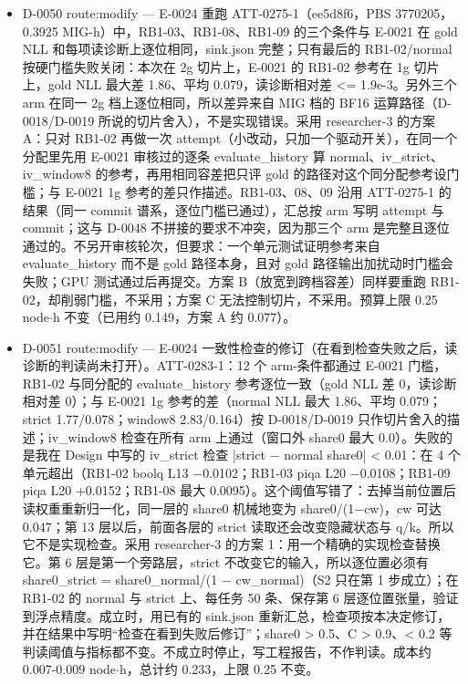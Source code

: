 \documentclass[11pt]{article}
\begin{document}
\begin{itemize}
\item D-0050 route:modify --- E-0024 重跑 ATT-0275-1（ee5d8f6，PBS 3770205，0.3925 MIG-h）中，RB1-03、RB1-08、RB1-09 的三个条件与 E-0021 在 gold NLL 和每项读诊断上逐位相同，sink.json 完整；只有最后的 RB1-02/normal 按硬门槛失败关闭：本次在 2g 切片上，E-0021 的 RB1-02 参考在 1g 切片上，gold NLL 最大差 1.86、平均 0.079，读诊断相对差 \textless{}= 1.9e-3。另外三个 arm 在同一 2g 档上逐位相同，所以差异来自 MIG 档的 BF16 运算路径（D-0018/D-0019 所说的切片舍入），不是实现错误。采用 researcher-3 的方案 A：只对 RB1-02 再做一次 attempt（小改动，只加一个驱动开关），在同一个分配里先用 E-0021 审核过的逐条 evaluate\_history 算 normal、iv\_strict、iv\_window8 的参考，再用相同容差把只评 gold 的路径对这个同分配参考设门槛；与 E-0021 1g 参考的差只作描述。RB1-03、08、09 沿用 ATT-0275-1 的结果（同一 commit 谱系，逐位门槛已通过），汇总按 arm 写明 attempt 与 commit；这与 D-0048 不拼接的要求不冲突，因为那三个 arm 是完整且逐位通过的。不另开审核轮次，但要求：一个单元测试证明参考来自 evaluate\_history 而不是 gold 路径本身，且对 gold 路径输出加扰动时门槛会失败；GPU 测试通过后再提交。方案 B（放宽到跨档容差）同样要重跑 RB1-02，却削弱门槛，不采用；方案 C 无法控制切片，不采用。预算上限 0.25 node\ensuremath{\cdot}h 不变（已用约 0.149，方案 A 约 0.077）。
\item D-0051 route:modify --- E-0024 一致性检查的修订（在看到检查失败之后，读诊断的判读尚未打开）。ATT-0283-1：12 个 arm-条件都通过 E-0021 门槛，RB1-02 与同分配的 evaluate\_history 参考逐位一致（gold NLL 差 0，读诊断相对差 0）；与 E-0021 1g 参考的差（normal NLL 最大 1.86、平均 0.079；strict 1.77/0.078；window8 2.83/0.164）按 D-0018/D-0019 只作切片舍入的描述；iv\_window8 检查在所有 arm 上通过（窗口外 share0 最大 0.0）。失败的是我在 Design 中写的 iv\_strict 检查 |strict \ensuremath{-} normal share0| \textless{} 0.01：在 4 个单元超出（RB1-02 boolq L13 \ensuremath{-}0.0102；RB1-03 piqa L20 \ensuremath{-}0.0108；RB1-09 piqa L20 +0.0152；RB1-08 最大 0.0095）。这个阈值写错了：去掉当前位置后读权重重新归一化，同一层的 share0 机械地变为 share0/(1\ensuremath{-}cw)，cw 可达 0.047；第 13 层以后，前面各层的 strict 读取还会改变隐藏状态与 q/k。所以它不是实现检查。采用 researcher-3 的方案 1：用一个精确的实现检查替换它。第 6 层是第一个旁路层，strict 不改变它的输入，所以逐位置必须有 share0\_strict = share0\_normal/(1 \ensuremath{-} cw\_normal)（S2 只在第 1 步成立）；在 RB1-02 的 normal 与 strict 上、每任务 50 条、保存第 6 层逐位置张量，验证到浮点精度。成立时，用已有的 sink.json 重新汇总，检查项按本决定修订，并在结果中写明``检查在看到失败后修订''；share0 \textgreater{} 0.5、C \textgreater{} 0.9、\textless{} 0.2 等判读阈值与指标都不变。不成立时停止，写工程报告，不作判读。成本约 0.007-0.009 node\ensuremath{\cdot}h，总计约 0.233，上限 0.25 不变。

\end{itemize}
\end{document}
